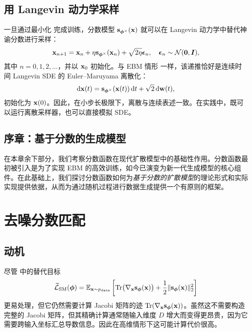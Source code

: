 \subsection{用 Langevin 动力学采样}
一旦通过最小化  完成训练，分数模型 ${\mathbf{s}}_{\bm{\phi}^\times}({\mathbf{x}})$ 就可以在 Langevin 动力学中替代神谕分数进行采样：
\begin{align}\label{eq:score-langevin-emp}
    \mathbf{x}_{n+1} = \mathbf{x}_n + \eta   {\mathbf{s}}_{\bm{\phi}^\times}({\mathbf{x}}_n) + \sqrt{2\eta}    \bm{\epsilon}_n, \quad \bm{\epsilon}_n \sim \mathcal{N}(\bm{0}, \bm{I}),
\end{align}
其中 $n=0,1,2,\dots$，并以 ${\mathbf{x}}_0$ 初始化。与 EBM 情形  一样，该递推恰好是连续时间 Langevin SDE 的 Euler–Maruyama 离散化：
\begin{align*}
    \mathop{}\!\mathrm{d} {\mathbf{x}}(t) = {\mathbf{s}}_{\bm{\phi}^\times}({\mathbf{x}}(t)) \mathop{}\!\mathrm{d} t + \sqrt{2} \mathop{}\!\mathrm{d} \mathbf{w}(t),
\end{align*}
初始化为 ${\mathbf{x}}(0)$。因此，在小步长极限下，离散与连续表述一致。在实践中，既可以运行离散采样器，也可以直接模拟 SDE。



\subsection{序章：基于分数的生成模型}

在本章余下部分，我们考察分数函数在现代扩散模型中的基础性作用。分数函数最初被引入是为了实现 EBM 的高效训练，如今已演变为新一代生成模型的核心组件。在此基础上，我们探讨分数函数如何为\emph{基于分数的扩散模型}的理论形式和实际实现提供依据，从而为通过随机过程进行数据生成提供一个有原则的框架。


\clearpage
\newpage


\section{\texorpdfstring{去噪分数匹配}{去噪分数匹配}}\label{sec:dsm}

\subsection{动机}
尽管  中的替代目标
\begin{align*}
    \widetilde{\mathcal{L}}_{\text{SM}}(\bm{\phi}) = \mathbb{E}_{{\mathbf{x}} \sim p_{\mathrm{data}}} \left[\mathrm{Tr}\big(\nabla_{{\mathbf{x}}}{\mathbf{s}}_{\bm{\phi}}({\mathbf{x}})\big) + \frac{1}{2} \|{\mathbf{s}}_{\bm{\phi}}({\mathbf{x}})\|_2^2 \right]
\end{align*}
更易处理，但它仍然需要计算 Jacobi 矩阵的迹 $\mathrm{Tr}(\nabla_{{\mathbf{x}}}{\mathbf{s}}_{\bm{\phi}}({\mathbf{x}}))$。虽然这不需要构造完整的 Jacobi 矩阵，但其精确计算通常随输入维度 $D$ 增大而变得更昂贵，因为它需要跨输入坐标汇总导数信息。因此在高维情形下这可能计算代价很高。


